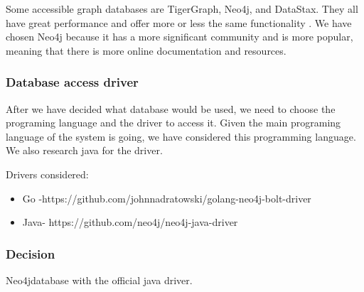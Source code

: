 \indent
\indent
Some accessible graph databases are TigerGraph, Neo4j, and DataStax. They all have great performance and offer more or less the same functionality \cite{gdbcomparison}. We have chosen Neo4j because it has a more significant community and is more popular, meaning that there is more online documentation and resources.

\subsubsection{Database access driver}

\indent
\indent
After we have decided what database would be used, we need to choose the programing language and the driver to access it.
Given the main programing language of the system is going, we have considered this programming language. We also research java for the driver.

Drivers considered:
\begin{itemize}
	\item Go -https://github.com/johnnadratowski/golang-neo4j-bolt-driver
	\item Java- https://github.com/neo4j/neo4j-java-driver
\end{itemize}

\subsubsection{Decision}

\indent
\indent
Neo4jdatabase with the official java driver.
